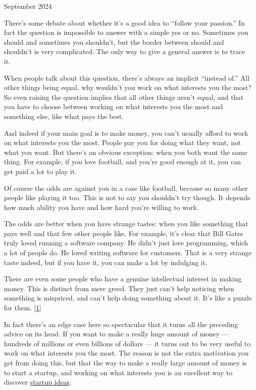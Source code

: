 September 2024

There's some debate about whether it's a good idea to ``follow your
passion.'' In fact the question is impossible to answer with a simple
yes or no. Sometimes you should and sometimes you shouldn't, but the
border between should and shouldn't is very complicated. The only way to
give a general answer is to trace it.

When people talk about this question, there's always an implicit
``instead of.'' All other things being equal, why wouldn't you work on
what interests you the most? So even raising the question implies that
all other things aren't equal, and that you have to choose between
working on what interests you the most and something else, like what
pays the best.

And indeed if your main goal is to make money, you can't usually afford
to work on what interests you the most. People pay you for doing what
they want, not what you want. But there's an obvious exception: when you
both want the same thing. For example, if you love football, and you're
good enough at it, you can get paid a lot to play it.

Of course the odds are against you in a case like football, because so
many other people like playing it too. This is not to say you shouldn't
try though. It depends how much ability you have and how hard you're
willing to work.

The odds are better when you have strange tastes: when you like
something that pays well and that few other people like. For example,
it's clear that Bill Gates truly loved running a software company. He
didn't just love programming, which a lot of people do. He loved writing
software for customers. That is a very strange taste indeed, but if you
have it, you can make a lot by indulging it.

There are even some people who have a genuine intellectual interest in
making money. This is distinct from mere greed. They just can't help
noticing when something is mispriced, and can't help doing something
about it. It's like a puzzle for them. {[}\hyperref[f1n]{1}{]}

In fact there's an edge case here so spectacular that it turns all the
preceding advice on its head. If you want to make a really huge amount
of money --- hundreds of millions or even billions of dollars --- it
turns out to be very useful to work on what interests you the most. The
reason is not the extra motivation you get from doing this, but that the
way to make a really large amount of money is to start a startup, and
working on what interests you is an excellent way to discover
\href{startupideas.html}{startup ideas}.

